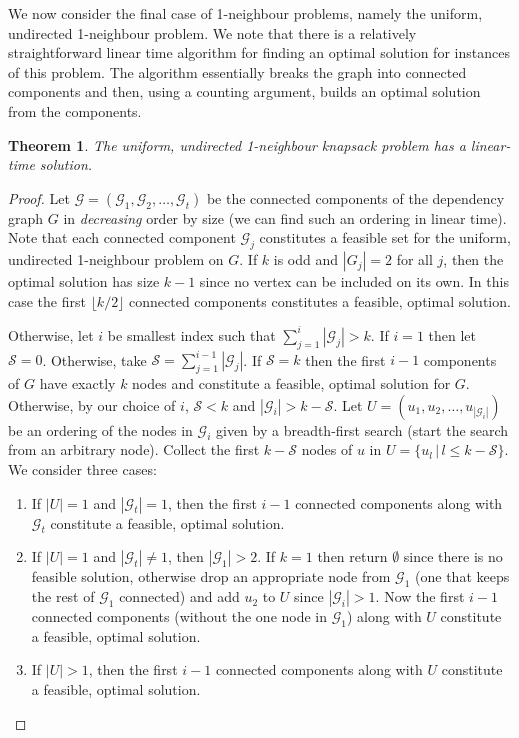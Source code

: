 \documentclass[12pt]{article}
\newtheorem{theorem}{Theorem}
\begin{document}
We now consider the final case of 1-neighbour problems, namely the
uniform, undirected 1-neighbour problem.
We note that there is a relatively straightforward
linear time algorithm for finding an optimal solution for instances of this problem.  The algorithm essentially breaks the graph into connected components and then, using a counting argument, builds an optimal solution from the components.



\begin{theorem} \label{thm:uu1n}
The uniform, undirected 1-neighbour knapsack problem has a linear-time solution.
\end{theorem}




\begin{proof}
Let $\mathcal{G}=(\mathcal{G}_{1}, \mathcal{G}_{2}, \ldots,
\mathcal{G}_{t})$ be the connected components of the dependency graph
$G$ in {\em decreasing} order by size (we can find such an ordering in linear time).  Note that each connected
component $\mathcal{G}_{j}$ constitutes a feasible set for the
uniform, undirected 1-neighbour problem on $G$.  If $k$ is odd and
$|G_{j}|=2$ for all $j$, then the optimal solution has size $k-1$ since no vertex can
be included on its own.  In this case the first $\lfloor k/2 \rfloor$ connected
components constitutes a feasible, optimal solution.

Otherwise, let $i$ be smallest index such that $\sum_{j=1}^{i} |\mathcal{G}_{j}| > k$.  If $i=1$ then
let $\mathcal{S}=0$.  Otherwise, take $\mathcal{S}=\sum_{j=1}^{i-1}
|\mathcal{G}_{j}|$.  If $\mathcal{S}=k$ then the first $i-1$
components of $G$ have exactly $k$ nodes and constitute a feasible,
optimal solution for $G$.  Otherwise, by our choice of $i$,
$\mathcal{S}<k$ and $|\mathcal{G}_{i}|>k-\mathcal{S}$.  Let $U=(u_{1},u_{2}, \ldots, u_{|\mathcal{G}_{i}|})$ be an ordering of the nodes in
$\mathcal{G}_{i}$ given by a breadth-first search (start the search
from an arbitrary node).  Collect the first $k-\mathcal{S}$ nodes of $u$ in $U=\{u_{l} \,|\, l \leq
k-\mathcal{S}\}$.  We consider three cases:
\begin{enumerate}
\item If $|U|=1$ and $|\mathcal{G}_{t}|=1$, then the first $i-1$
connected components along with $\mathcal{G}_{t}$ constitute a
feasible, optimal solution.
\item If $|U|=1$ and $|\mathcal{G}_{t}|
\neq 1$, then $|\mathcal{G}_{1}|>2$.  If $k=1$ then return
$\emptyset$ since there is no feasible solution, otherwise drop an
appropriate node from $\mathcal{G}_{1}$ (one that keeps the rest of
$\mathcal{G}_{1}$ connected) and add $u_{2}$ to $U$ since
$|\mathcal{G}_{i}|>1$.  Now the first $i-1$ connected components
(without the one node in $\mathcal{G}_{1}$) along with $U$
constitute a feasible, optimal solution.
\item If $|U|>1$, then the
first $i-1$ connected components along with $U$ constitute a
feasible, optimal solution.
\end{enumerate}
\end{proof}
\end{document}
